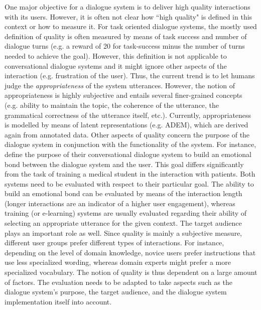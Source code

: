 One major objective for a dialogue system is to deliver high quality interactions with its users. However, it is often not clear how ``high quality" is defined in this context or how to measure it. For task oriented dialogue systems, the mostly used definition of quality is often measured by means of task success and number of dialogue turns (e.g. a reward of 20 for task-success minus the number of turns needed to achieve the goal). However, this definition is not applicable to conversational dialogue systems and it might ignore other aspects of the interaction (e.g. frustration of the user). Thus, the current trend is to let humans judge the \emph{appropriateness} of the system utterances. However, the notion of appropriateness is highly subjective and entails several finer-grained concepts (e.g. ability to maintain the topic, the coherence of the utterance, the grammatical correctness of the utterance itself, etc.). Currently, appropriateness is modelled by means of latent representations (e.g. ADEM), which are derived again from annotated data. 
Other aspects of quality concern the purpose of the dialogue system in conjunction with the functionality of the system. For instance,  define the purpose of their conversational dialogue system to build an emotional bond between the dialogue system and the user. This goal differs significantly from the task of training a medical student in the interaction with patients. Both systems need to be evaluated with respect to their particular goal. The ability to build an emotional bond can be evaluated by means of the interaction length (longer interactions are an indicator of a higher user engagement), whereas training (or e-learning) systems are usually evaluated regarding their ability of selecting an appropriate utterance for the given context.
The target audience plays an important role as well. Since quality is mainly a subjective measure, different user groups prefer different types of interactions. For instance, depending on the level of domain knowledge, novice users prefer instructions that use less specialized wording, whereas domain experts might prefer a more specialized vocabulary. 
The notion of quality is thus dependent on a large amount of factors. The evaluation needs to be adapted to take aspects such as the dialogue system's purpose, the target audience, and the dialogue system implementation itself into account.

